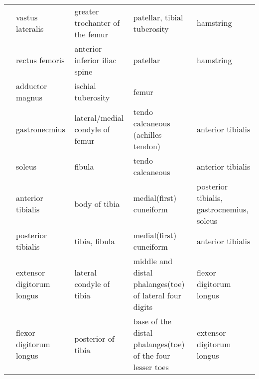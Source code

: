 \documentclass[a4paper,10pt]{article}
\begin{document}
\begin{landscape}
\begin{scriptsize}
\begin{tabular}{|l|l|p{4cm}|p{4cm}|l|}
                    & vastus lateralis          & greater trochanter of the femur                         & patellar, tibial tuberosity                               & hamstring          \\
                    & rectus femoris            & anterior inferior iliac spine                           & patellar                                                  & hamstring          \\
  \hline
                    & adductor magnus           & ischial tuberosity                                      & femur                                                     &                    \\
                    & gastronecmius             & lateral/medial condyle of femur                         & tendo calcaneous (achilles tendon)                        & anterior tibialis  \\
                    & soleus                    & fibula                                                  & tendo calcaneous                                          & anterior tibialis  \\
                    & anterior tibialis         & body of tibia                                           & medial(first) cuneiform                                   & posterior tibialis, gastrocnemius, soleus \\
                    & posterior tibialis        & tibia, fibula                                           & medial(first) cuneiform                                   & anterior tibialis  \\
                    & extensor digitorum longus & lateral condyle of tibia                                & middle and distal phalanges(toe) of lateral four digits   & flexor digitorum longus \\
                    & flexor digitorum longus   & posterior of tibia                                      & base of the distal phalanges(toe) of the four lesser toes & extensor digitorum longus \\
\end{tabular}
\end{scriptsize}
\end{landscape}


\end{document}
